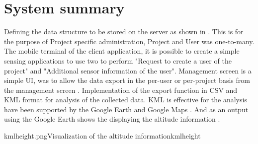 \section{System summary}
Defining the data structure to be stored on the server as shown in . This is for the purpose of Project specific administration, Project and User was one-to-many.
The mobile terminal of the client application, it is possible to create a simple sensing applications to use two to perform "Request to create a user of the project" and "Additional sensor information of the user".
Management screen is a simple UI, was to allow the data export in the per-user or per-project basis from the management screen  . Implementation of the export function in CSV and KML format for analysis of the collected data. KML is effective for the analysis have been supported by the Google Earth and Google Maps . And as an output using the Google Earth shows the displaying the altitude information .


\vspace{-1cm}

{kmlheight.png}{Visualization of the altitude information}{kmlheight}


\newpage
